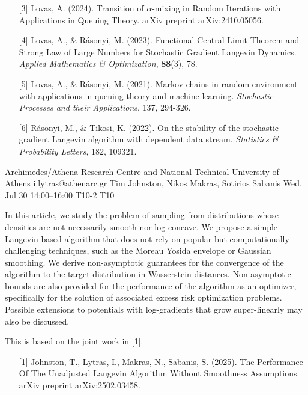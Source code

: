 \begin{talk}
\begin{enumerate}
	\item[{[3]}] Lovas, A. (2024). Transition of $\alpha $-mixing in Random Iterations with Applications in Queuing Theory. arXiv preprint arXiv:2410.05056.
	
	\item[{[4]}] Lovas, A., \& R\'asonyi, M. (2023). Functional Central Limit Theorem and Strong Law of Large Numbers for Stochastic Gradient Langevin Dynamics. {\it Applied Mathematics \& Optimization}, \textbf{88}(3), 78.
	
	\item[{[5]}] Lovas, A., \& R\'asonyi, M. (2021). Markov chains in random environment with applications in queuing theory and machine learning. {\it Stochastic Processes and their Applications}, 137, 294-326.
	
	\item[{[6]}] R\'asonyi, M., \& Tikosi, K. (2022). On the stability of the stochastic gradient Langevin algorithm with dependent data stream. {\it Statistics \& Probability Letters}, 182, 109321.
	
\end{enumerate}

\end{talk}

\begin{talk}
  {Archimedes/Athena Research Centre and National Technical University of Athens}%
  {i.lytras@athenarc.gr}%
  {Tim Johnston, Nikos Makras, Sotirios Sabanis}%
  {}%
  {}%
  {}%
  {Wed, Jul 30 14:00–16:00}%
  {T10-2}%
  {T10}%
  
				
			
In this article, we study the problem of sampling from distributions whose densities are not necessarily smooth nor log-concave. We propose a simple Langevin-based algorithm that does not rely on popular but computationally challenging techniques, such as the Moreau Yosida envelope or Gaussian smoothing. We derive non-asymptotic guarantees for the convergence of the algorithm to the target distribution in Wasserstein distances. Non asymptotic bounds are also provided for the performance of the algorithm as an optimizer, specifically for the solution of associated excess risk optimization problems.\\
Possible extensions to potentials with log-gradients that grow super-linearly may also be discussed.

This is based on the joint work in [1].
\medskip

\begin{enumerate}
    \item [{[1]}] Johnston, T., Lytras, I., Makras, N., Sabanis, S. (2025). The Performance Of The Unadjusted Langevin Algorithm Without Smoothness Assumptions. arXiv preprint arXiv:2502.03458.
\end{enumerate}
\end{talk}

